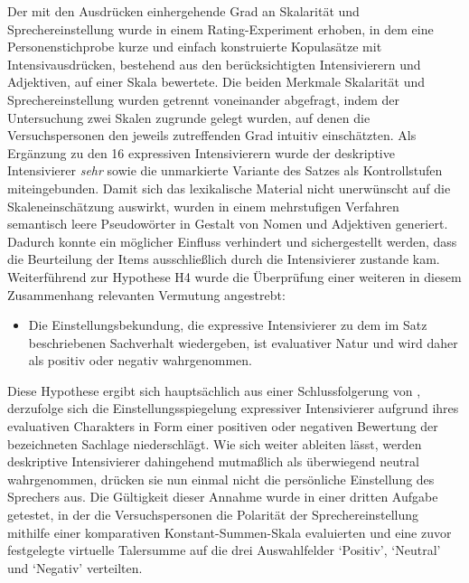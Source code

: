 Der mit den Ausdrücken einhergehende Grad an Skalarität und Sprechereinstellung wurde in einem Rating-Experiment erhoben, in dem eine Personenstichprobe kurze und einfach konstruierte Kopulasätze mit Intensivausdrücken, bestehend aus den berücksichtigten Intensivierern und Adjektiven, auf einer Skala bewertete. Die beiden Merkmale Skalarität und Sprechereinstellung wurden getrennt voneinander abgefragt, indem der Untersuchung zwei Skalen zugrunde gelegt wurden, auf denen die Versuchspersonen den jeweils zutreffenden Grad intuitiv einschätzten. Als Ergänzung zu den 16 expressiven Intensivierern wurde der deskriptive Intensivierer \textit{sehr} sowie die unmarkierte Variante des Satzes als Kontrollstufen miteingebunden. Damit sich das lexikalische Material nicht unerwünscht auf die Skaleneinschätzung auswirkt, wurden in einem mehrstufigen Verfahren semantisch leere Pseudowörter in Gestalt von Nomen und Adjektiven generiert. Dadurch konnte ein möglicher Einfluss verhindert und sichergestellt werden, dass die Beurteilung der Items ausschließlich durch die Intensivierer zustande kam. Weiterführend zur Hypothese H4 wurde die Überprüfung einer weiteren in diesem Zusammenhang relevanten Vermutung angestrebt:

\begin{itemize}
\item[\textbf{\textsc{H5}}] Die Einstellungsbekundung, die expressive Intensivierer zu dem im Satz beschriebenen Sachverhalt wiedergeben, ist evaluativer Natur und wird daher als positiv oder negativ wahrgenommen.
\end{itemize}

\noindent Diese Hypothese ergibt sich hauptsächlich aus einer Schlussfolgerung von \citet[135]{Gutzmann.2019a}, derzufolge sich die Einstellungsspiegelung expressiver Intensivierer aufgrund ihres evaluativen Charakters in Form einer positiven oder negativen Bewertung der bezeichneten Sachlage niederschlägt. Wie sich weiter ableiten lässt, werden deskriptive Intensivierer dahingehend mutmaßlich als überwiegend neutral wahrgenommen, drücken sie nun einmal nicht die persönliche Einstellung des Sprechers aus. Die Gültigkeit dieser Annahme wurde in einer dritten Aufgabe getestet, in der die Versuchspersonen die Polarität der Sprechereinstellung mithilfe einer komparativen Konstant-Summen-Skala evaluierten und eine zuvor festgelegte virtuelle Talersumme auf die drei Auswahlfelder `Positiv', `Neutral' und `Negativ' verteilten.


